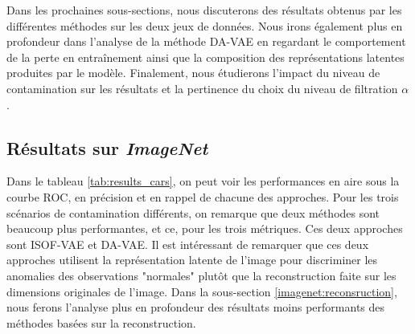 Dans les prochaines sous-sections, nous discuterons des résultats obtenus par les différentes méthodes sur les deux jeux de données. Nous irons également plus en profondeur dans l'analyse de la méthode DA-VAE en regardant le comportement de la perte en entraînement ainsi que la composition des représentations latentes produites par le modèle. Finalement, nous étudierons l'impact du niveau de contamination sur les résultats et la pertinence du choix du niveau de filtration $\alpha$.

\subsection{Résultats sur \textit{ImageNet}} \label{imagenet_results}

Dans le tableau \ref{tab:results_cars}, on peut voir les performances en aire sous la courbe ROC, en précision et en rappel de chacune des approches. Pour les trois scénarios de contamination différents, on remarque que deux méthodes sont beaucoup plus performantes, et ce, pour les trois métriques. Ces deux approches sont ISOF-VAE et DA-VAE. Il est intéressant de remarquer que ces deux approches utilisent la représentation latente de l'image pour discriminer les anomalies des observations "normales" plutôt que la reconstruction faite sur les dimensions originales de l'image. Dans la sous-section \ref{imagenet:reconsruction}, nous ferons l'analyse plus en profondeur des résultats moins performants des méthodes basées sur la reconstruction.

